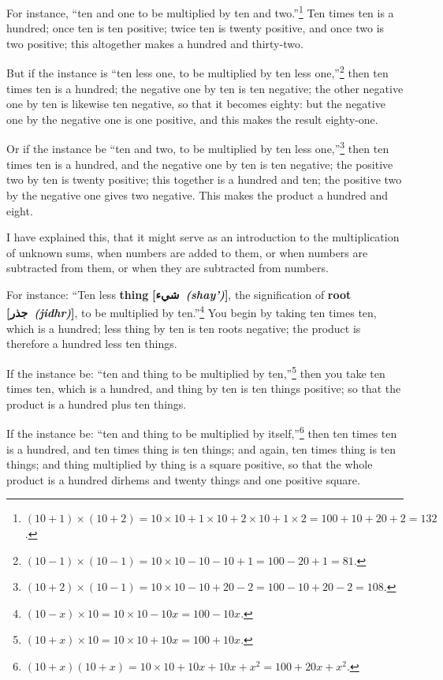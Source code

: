 For instance, ``ten and one to be multiplied by ten and two.''\footnote{$(10 + 1) \times (10 + 2) = 10 \times 10 + 1 \times 10 + 2 \times 10 + 1 \times 2 = 100 + 10 + 20 + 2 = 132$.} Ten times ten is a hundred; once ten is ten positive; twice ten is twenty positive, and once two is two positive; this altogether makes a hundred and thirty-two.

But if the instance is ``ten less one, to be multiplied by ten less one,''\footnote{$(10 - 1) \times (10 - 1) = 10 \times 10 - 10 - 10 + 1 = 100 - 20 + 1 = 81$.} then ten times ten is a hundred; the negative one by ten is ten negative; the other negative one by ten is likewise ten negative, so that it becomes eighty: but the negative one by the negative one is one positive, and this makes the result eighty-one.

Or if the instance be ``ten and two, to be multiplied by ten less one,''\footnote{$(10 + 2) \times (10 - 1) = 10 \times 10 - 10 + 20 - 2 = 100 - 10 + 20 - 2 = 108$.} then ten times ten is a hundred, and the negative one by ten is ten negative; the positive two by ten is twenty positive; this together is a hundred and ten; the positive two by the negative one gives two negative. This makes the product a hundred and eight.

I have explained this, that it might serve as an introduction to the multiplication of unknown sums, when numbers are added to them, or when numbers are subtracted from them, or when they are subtracted from numbers.

For instance: ``Ten less \textbf{thing} \textbf{[\arabicfont\beginR شيء\endR\ \textit{(shay')}]}, the signification of \textbf{root} \textbf{[\arabicfont\beginR جذر\endR\ \textit{(jidhr)}]}, to be multiplied by ten.''\footnote{$(10 - x) \times 10 = 10 \times 10 - 10x = 100 - 10x$.} You begin by taking ten times ten, which is a hundred; less thing by ten is ten roots negative; the product is therefore a hundred less ten things.

If the instance be: ``ten and thing to be multiplied by ten,''\footnote{$(10 + x) \times 10 = 10 \times 10 + 10x = 100 + 10x$.} then you take ten times ten, which is a hundred, and thing by ten is ten things positive; so that the product is a hundred plus ten things.

If the instance be: ``ten and thing to be multiplied by itself,''\footnote{$(10 + x)(10 + x) = 10 \times 10 + 10x + 10x + x^2 = 100 + 20x + x^2$.} then ten times ten is a hundred, and ten times thing is ten things; and again, ten times thing is ten things; and thing multiplied by thing is a square positive, so that the whole product is a hundred dirhems and twenty things and one positive square.

